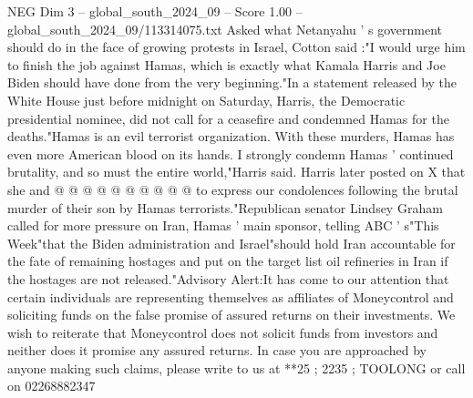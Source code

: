 \begin{textsample}{NEG Dim 3 – global\_south\_2024\_09 – Score 1.00 – global\_south\_2024\_09/113314075.txt}
Asked what Netanyahu ' s government should do in the face of growing protests in Israel, Cotton said :"I would urge him to finish the job against Hamas, which is exactly what Kamala Harris and Joe Biden should have done from the very beginning."In a statement released by the White House just before midnight on Saturday, Harris, the Democratic presidential nominee, did not call for a ceasefire and condemned Hamas for the deaths."Hamas is an evil terrorist organization.
With these murders, Hamas has even more American blood on its hands.
I strongly condemn Hamas ' continued brutality, and so must the entire world,"Harris said.
Harris later posted on X that she and @ @ @ @ @ @ @ @ @ @ to express our condolences following the brutal murder of their son by Hamas terrorists."Republican senator Lindsey Graham called for more pressure on Iran, Hamas ' main sponsor, telling ABC ' s"This Week"that the Biden administration and Israel"should hold Iran accountable for the fate of remaining hostages and put on the target list oil refineries in Iran if the hostages are not released."Advisory Alert:It has come to our attention that certain individuals are representing themselves as affiliates of Moneycontrol and soliciting funds on the false promise of assured returns on their investments.
We wish to reiterate that Moneycontrol does not solicit funds from investors and neither does it promise any assured returns.
In case you are approached by anyone making such claims, please write to us at **25 ; 2235 ; TOOLONG or call on 02268882347

\end{textsample}

